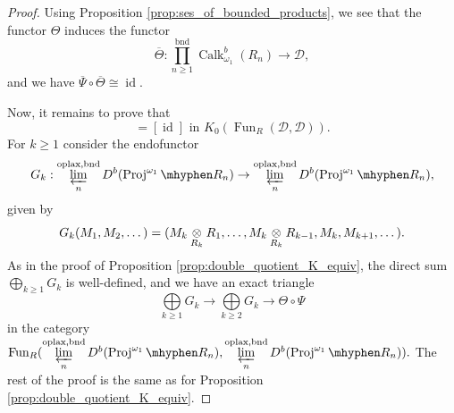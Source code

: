 \documentclass[11pt,leqno]{amsart}
\numberwithin{equation}{section}
\newcommand{\tens}[1]{%
  \mathbin{\mathop{\otimes}\displaylimits_{#1}}%
}
\newcommand{\hy}{\mhyphen}
\newcommand{\prolim}[1][]{\mathop{\varprojlim}\limits_{#1}}
\newcommand{\biggplus}[1][]{\mathop{\bigoplus}\limits_{#1}}
\newcommand{\prodd}[1][]{\mathop{\prod}\limits_{#1}}
\newcommand{\bbar}{\overline}
\newcommand{\bnd}{\operatorname{bnd}}
\newcommand{\oplax}{\operatorname{oplax}}
\newcommand{\Proj}{\operatorname{Proj}}
\newcommand{\cD}{{\mathcal D}}
\newcommand{\Fun}{\operatorname{Fun}}
\newcommand{\Perf}{\operatorname{Perf}}
\newcommand{\Calk}{\operatorname{Calk}}
\newcommand{\id}{\operatorname{id}}
\begin{document}
\begin{proof}
Using Proposition \ref{prop:ses_of_bounded_products}, we see that the functor $\Theta$ induces the functor
\begin{equation*}
\bbar{\Theta}:\prodd[n\geq 1]^{\bnd}\Calk_{\omega_1}^b(R_n)\to \cD,
\end{equation*}
and we have $\bbar{\Psi}\circ\bbar{\Theta}\cong\id.$

Now, it remains to prove that
\begin{equation*}
[\bbar{\Theta}\circ\bbar{\Psi}]=[\id]\text{ in }K_0(\Fun_R(\cD,\cD)).
\end{equation*}
For $k\geq 1$ consider the endofunctor
\begin{equation*}
G_k:\prolim[n]^{\oplax,\bnd} D^b(\Proj^{\omega_1}\hy R_n)\to \prolim[n]^{\oplax,\bnd} D^b(\Proj^{\omega_1}\hy R_n),
\end{equation*}
given by
\begin{equation*}
G_k(M_1,M_2,\dots) = (M_k\tens{R_k}R_1,\dots,M_k\tens{R_k}R_{k-1},M_k,M_{k+1},\dots).
\end{equation*}
As in the proof of Proposition \ref{prop:double_quotient_K_equiv}, the direct sum $\biggplus[k\geq 1]G_k$ is well-defined,
and we have an exact triangle
\begin{equation*}
\biggplus[k\geq 1]G_k\to \biggplus[k\geq 2] G_k\to \Theta\circ\Psi
\end{equation*}
in the category $\Fun_R(\prolim[n]^{\oplax,\bnd}D^b(\Proj^{\omega_1}\hy R_n),\prolim[n]^{\oplax,\bnd}D^b(\Proj^{\omega_1}\hy R_n)).$ 
The rest of the proof is the same as for Proposition \ref{prop:double_quotient_K_equiv}.


\end{proof}
\end{document}
